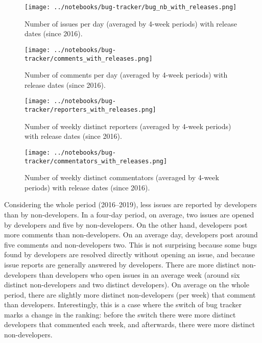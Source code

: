 \begin{figure}
	\begin{center}
		\texttt{[image: ../notebooks/bug-tracker/bug\_nb\_with\_releases.png]}
		\caption{Number of issues per day (averaged by 4-week periods) with release dates (since 2016).} \label{bug_nb_with_releases}
	\end{center}
\end{figure}

\begin{figure}
	\begin{center}
		\texttt{[image: ../notebooks/bug-tracker/comments\_with\_releases.png]}
		\caption{Number of comments per day (averaged by 4-week periods) with release dates (since 2016).} \label{comments_with_releases}
	\end{center}
\end{figure}

\begin{figure}
	\begin{center}
		\texttt{[image: ../notebooks/bug-tracker/reporters\_with\_releases.png]}
		\caption{Number of weekly distinct reporters (averaged by 4-week periods) with release dates (since 2016).} \label{reporters_with_releases}
	\end{center}
\end{figure}

\begin{figure}
	\begin{center}
		\texttt{[image: ../notebooks/bug-tracker/commentators\_with\_releases.png]}
		\caption{Number of weekly distinct commentators (averaged by 4-week periods) with release dates (since 2016).} \label{commentators_with_releases}
	\end{center}
\end{figure}

Considering the whole period (2016--2019), less issues are reported by developers than by non-developers.
In a four-day period, on average, two issues are opened by developers and five by non-developers.
On the other hand, developers post more comments than non-developers.
On an average day, developers post around five comments and non-developers two.
This is not surprising because some bugs found by developers are resolved directly without opening an issue, and because issue reports are generally answered by developers.
There are more distinct non-developers than developers who open issues in an average week (around six distinct non-developers and two distinct developers).
On average on the whole period, there are slightly more distinct non-developers (per week) that comment than developers.
Interestingly, this is a case where the switch of bug tracker marks a change in the ranking: before the switch there were more distinct developers that commented each week, and afterwards, there were more distinct non-developers.

